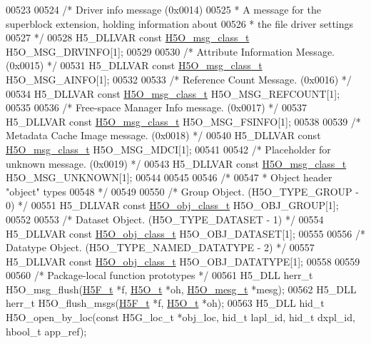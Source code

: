 \begin{DoxyCode}
00523 
00524 \textcolor{comment}{/* Driver info message (0x0014)}
00525 \textcolor{comment}{ * A message for the superblock extension, holding information about}
00526 \textcolor{comment}{ * the file driver settings}
00527 \textcolor{comment}{ */}
00528 H5\_DLLVAR \textcolor{keyword}{const} \hyperlink{struct_h5_o__msg__class__t}{H5O\_msg\_class\_t} H5O\_MSG\_DRVINFO[1];
00529 
00530 \textcolor{comment}{/* Attribute Information Message. (0x0015) */}
00531 H5\_DLLVAR \textcolor{keyword}{const} \hyperlink{struct_h5_o__msg__class__t}{H5O\_msg\_class\_t} H5O\_MSG\_AINFO[1];
00532 
00533 \textcolor{comment}{/* Reference Count Message. (0x0016) */}
00534 H5\_DLLVAR \textcolor{keyword}{const} \hyperlink{struct_h5_o__msg__class__t}{H5O\_msg\_class\_t} H5O\_MSG\_REFCOUNT[1];
00535 
00536 \textcolor{comment}{/* Free-space Manager Info message. (0x0017) */}
00537 H5\_DLLVAR \textcolor{keyword}{const} \hyperlink{struct_h5_o__msg__class__t}{H5O\_msg\_class\_t} H5O\_MSG\_FSINFO[1];
00538 
00539 \textcolor{comment}{/* Metadata Cache Image message. (0x0018) */}
00540 H5\_DLLVAR \textcolor{keyword}{const} \hyperlink{struct_h5_o__msg__class__t}{H5O\_msg\_class\_t} H5O\_MSG\_MDCI[1];
00541 
00542 \textcolor{comment}{/* Placeholder for unknown message. (0x0019) */}
00543 H5\_DLLVAR \textcolor{keyword}{const} \hyperlink{struct_h5_o__msg__class__t}{H5O\_msg\_class\_t} H5O\_MSG\_UNKNOWN[1];
00544 
00545 
00546 \textcolor{comment}{/*}
00547 \textcolor{comment}{ * Object header "object" types}
00548 \textcolor{comment}{ */}
00549 
00550 \textcolor{comment}{/* Group Object. (H5O\_TYPE\_GROUP - 0) */}
00551 H5\_DLLVAR \textcolor{keyword}{const} \hyperlink{struct_h5_o__obj__class__t}{H5O\_obj\_class\_t} H5O\_OBJ\_GROUP[1];
00552 
00553 \textcolor{comment}{/* Dataset Object. (H5O\_TYPE\_DATASET - 1) */}
00554 H5\_DLLVAR \textcolor{keyword}{const} \hyperlink{struct_h5_o__obj__class__t}{H5O\_obj\_class\_t} H5O\_OBJ\_DATASET[1];
00555 
00556 \textcolor{comment}{/* Datatype Object. (H5O\_TYPE\_NAMED\_DATATYPE - 2) */}
00557 H5\_DLLVAR \textcolor{keyword}{const} \hyperlink{struct_h5_o__obj__class__t}{H5O\_obj\_class\_t} H5O\_OBJ\_DATATYPE[1];
00558 
00559 
00560 \textcolor{comment}{/* Package-local function prototypes */}
00561 H5\_DLL herr\_t H5O\_msg\_flush(\hyperlink{struct_h5_f__t}{H5F\_t} *f, \hyperlink{struct_h5_o__t}{H5O\_t} *oh, \hyperlink{struct_h5_o__mesg__t}{H5O\_mesg\_t} *mesg);
00562 H5\_DLL herr\_t H5O\_flush\_msgs(\hyperlink{struct_h5_f__t}{H5F\_t} *f, \hyperlink{struct_h5_o__t}{H5O\_t} *oh);
00563 H5\_DLL hid\_t H5O\_open\_by\_loc(\textcolor{keyword}{const} H5G\_loc\_t *obj\_loc, hid\_t lapl\_id, hid\_t dxpl\_id, hbool\_t app\_ref);

\end{DoxyCode}
